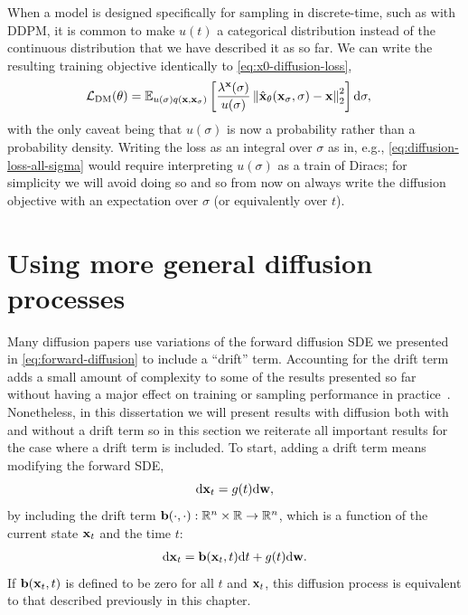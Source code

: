 When a model is designed specifically for sampling in discrete-time, such as with DDPM, it is common to make $u(t)$ a categorical distribution instead of the continuous distribution that we have described it as so far. 
We can write the resulting training objective identically to \cref{eq:x0-diffusion-loss},
\begin{align}
    {\mathcal{L}}_\text{DM}(\theta) &= \mathbb{E}_{u(\sigma)q({\mathbf{x}}, {\mathbf{x}}_\sigma)} \left[ \frac{\lambda^{\mathbf{x}}(\sigma)}{u(\sigma)} 
    \left\| \hat{{\mathbf{x}}}_\theta({\mathbf{x}}_\sigma, \sigma) - {\mathbf{x}} \right\|_2^2 \right] \mathrm{d}\sigma,
\end{align}
with the only caveat being that $u(\sigma)$ is now a probability rather than a probability density. Writing the loss as an integral over $\sigma$ as in, e.g., \cref{eq:diffusion-loss-all-sigma} would require interpreting $u(\sigma)$ as a train of Diracs; for simplicity we will avoid doing so and so from now on always write the diffusion objective with an expectation over $\sigma$ (or equivalently over $t$).

\section{Using more general diffusion processes} \label{sec:more-general-diffusion-processes}
Many diffusion papers use variations of the forward diffusion SDE we presented in \cref{eq:forward-diffusion} to include a ``drift'' term. Accounting for the drift term adds a small amount of complexity to some of the results presented so far without having a major effect on training or sampling performance in practice~\citep{karras2022elucidating}. Nonetheless, in this dissertation we will present results with diffusion both with and without a drift term so in this section we reiterate all important results for the case where a drift term is included. To start, adding a drift term means modifying the forward SDE,
\begin{equation}
    \mathrm{d}{\mathbf{x}}_t = g(t) \mathrm{d}{\mathbf{w}},
\end{equation}
by including the drift term ${\mathbf{b}}(\cdot, \cdot): \mathbb{R}^n \times \mathbb{R} \rightarrow \mathbb{R}^n$, which is a function of the current state ${\mathbf{x}}_t$ and the time $t$:
\begin{align} \label{eq:forward-diffusion-with-drift}
    \mathrm{d}{\mathbf{x}}_t = {\mathbf{b}}({\mathbf{x}}_t, t) \mathrm{d}t + g(t) \mathrm{d}{\mathbf{w}}.
\end{align}
If ${\mathbf{b}}({\mathbf{x}}_t, t)$ is defined to be zero for all $t$ and ${\mathbf{x}}_t$, this diffusion process is equivalent to that described previously in this chapter. 

